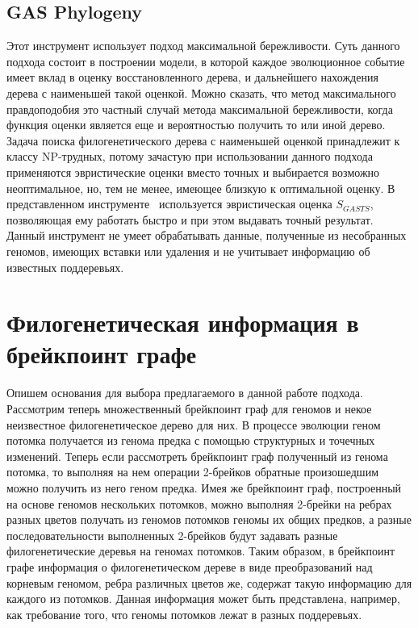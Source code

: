 \subsection{GAS Phylogeny}
Этот инструмент использует подход максимальной бережливости.
Суть данного подхода состоит в построении модели,
в которой каждое эволюционное событие имеет вклад в оценку восстановленного дерева, и дальнейшего нахождения дерева с наименьшей такой оценкой.
Можно сказать, что метод максимального правдоподобия это частный случай метода максимальной бережливости, когда функция оценки является
еще и вероятностью получить то или иной дерево.
Задача поиска филогенетического дерева с наименьшей оценкой принадлежит к классу NP-трудных, потому зачастую при использовании данного подхода
применяются эвристические оценки вместо точных и выбирается возможно неоптимальное, но, тем не менее, имеющее близкую к оптимальной оценку.
В представленном инструменте~\cite{xu2011gasts} используется эвристическая оценка $S_{GASTS}$, позволяющая ему работать быстро и при этом выдавать точный результат.
Данный инструмент не умеет обрабатывать данные, полученные из несобранных геномов, имеющих вставки или удаления и не учитывает информацию об
известных поддеревьях.

\section{Филогенетическая информация в брейкпоинт графе}

Опишем основания для выбора предлагаемого в данной работе подхода.
Рассмотрим теперь множественный брейкпоинт граф для геномов и некое неизвестное филогенетическое дерево для них.
В процессе эволюции геном потомка получается из генома предка с помощью структурных и точечных изменений.
Теперь если рассмотреть брейкпоинт граф полученный из генома потомка,
то выполняя на нем операции 2-брейков обратные произошедшим можно получить из него геном предка.
Имея же брейкпоинт граф, построенный на основе геномов нескольких потомков,
можно выполняя 2-брейки на ребрах разных цветов получать из геномов потомков геномы их общих предков,
а разные последовательности выполненных 2-брейков будут задавать разные филогенетические деревья на геномах потомков.
Таким образом, в брейкпоинт графе  информация о филогенетическом дереве в виде преобразований над корневым геномом,
ребра различных цветов же, содержат такую информацию для каждого из потомков.
Данная информация может быть представлена, например, как требование того, что геномы потомков лежат в разных поддеревьях.

